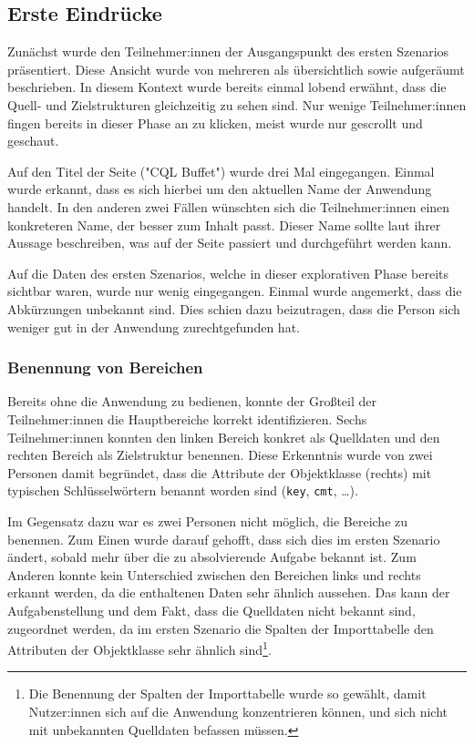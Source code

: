 \subsection{Erste Eindrücke}
\label{sec:impressions}

Zunächst wurde den Teilnehmer:innen der Ausgangspunkt des ersten Szenarios präsentiert. Diese Ansicht wurde von mehreren als übersichtlich sowie aufgeräumt beschrieben. In diesem Kontext wurde bereits einmal lobend erwähnt, dass die Quell- und Zielstrukturen gleichzeitig zu sehen sind. Nur wenige Teilnehmer:innen fingen bereits in dieser Phase an zu klicken, meist wurde nur gescrollt und geschaut.

Auf den Titel der Seite ("CQL Buffet") wurde drei Mal eingegangen. Einmal wurde erkannt, dass es sich hierbei um den aktuellen Name der Anwendung handelt. In den anderen zwei Fällen wünschten sich die Teilnehmer:innen einen konkreteren Name, der besser zum Inhalt passt. Dieser Name sollte laut ihrer Aussage beschreiben, was auf der Seite passiert und durchgeführt werden kann.

Auf die Daten des ersten Szenarios, welche in dieser explorativen Phase bereits sichtbar waren, wurde nur wenig eingegangen. Einmal wurde angemerkt, dass die Abkürzungen unbekannt sind. Dies schien dazu beizutragen, dass die Person sich weniger gut in der Anwendung zurechtgefunden hat.

\subsubsection{Benennung von Bereichen}

Bereits ohne die Anwendung zu bedienen, konnte der Großteil der Teilnehmer:innen die Hauptbereiche korrekt identifizieren. Sechs Teilnehmer:innen konnten den linken Bereich konkret als Quelldaten und den rechten Bereich als Zielstruktur benennen. Diese Erkenntnis wurde von zwei Personen damit begründet, dass die Attribute der Objektklasse (rechts) mit typischen Schlüsselwörtern benannt worden sind (\texttt{key}, \texttt{cmt}, \dots).

Im Gegensatz dazu war es zwei Personen nicht möglich, die Bereiche zu benennen. Zum Einen wurde darauf gehofft, dass sich dies im ersten Szenario ändert, sobald mehr über die zu absolvierende Aufgabe bekannt ist. Zum Anderen konnte kein Unterschied zwischen den Bereichen links und rechts erkannt werden, da die enthaltenen Daten sehr ähnlich aussehen. Das kann der Aufgabenstellung und dem Fakt, dass die Quelldaten nicht bekannt sind, zugeordnet werden, da im ersten Szenario die Spalten der Importtabelle den Attributen der Objektklasse sehr ähnlich sind\footnote{Die Benennung der Spalten der Importtabelle wurde so gewählt, damit Nutzer:innen sich auf die Anwendung konzentrieren können, und sich nicht mit unbekannten Quelldaten befassen müssen.}.

